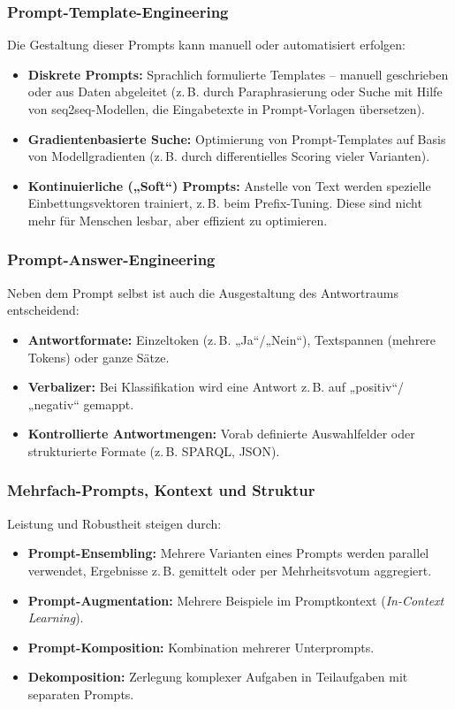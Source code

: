 \subsubsection{Prompt-Template-Engineering}

Die Gestaltung dieser Prompts kann manuell oder automatisiert erfolgen:
\begin{itemize}
  \item \textbf{Diskrete Prompts:} Sprachlich formulierte Templates – manuell geschrieben oder aus Daten abgeleitet (z.\,B. durch Paraphrasierung oder Suche mit Hilfe von seq2seq-Modellen, die Eingabetexte in Prompt-Vorlagen übersetzen).
  \item \textbf{Gradientenbasierte Suche:} Optimierung von Prompt-Templates auf Basis von Modellgradienten (z.\,B. durch differentielles Scoring vieler Varianten).
  \item \textbf{Kontinuierliche („Soft“) Prompts:} Anstelle von Text werden spezielle Einbettungsvektoren trainiert, z.\,B. beim Prefix-Tuning. Diese sind nicht mehr für Menschen lesbar, aber effizient zu optimieren.
\end{itemize}

\subsubsection{Prompt-Answer-Engineering}

Neben dem Prompt selbst ist auch die Ausgestaltung des Antwortraums entscheidend:
\begin{itemize}
  \item \textbf{Antwortformate:} Einzeltoken (z.\,B. „Ja“/„Nein“), Textspannen (mehrere Tokens) oder ganze Sätze.
  \item \textbf{Verbalizer:} Bei Klassifikation wird eine Antwort z.\,B. auf „positiv“/„negativ“ gemappt.
  \item \textbf{Kontrollierte Antwortmengen:} Vorab definierte Auswahlfelder oder strukturierte Formate (z.\,B. SPARQL, JSON).
\end{itemize}

\subsubsection{Mehrfach-Prompts, Kontext und Struktur}

Leistung und Robustheit steigen durch:
\begin{itemize}
  \item \textbf{Prompt-Ensembling:} Mehrere Varianten eines Prompts werden parallel verwendet, Ergebnisse z.\,B. gemittelt oder per Mehrheitsvotum aggregiert.
  \item \textbf{Prompt-Augmentation:} Mehrere Beispiele im Promptkontext (\emph{In-Context Learning}).
  \item \textbf{Prompt-Komposition:} Kombination mehrerer Unterprompts.
  \item \textbf{Dekomposition:} Zerlegung komplexer Aufgaben in Teilaufgaben mit separaten Prompts.
\end{itemize}

